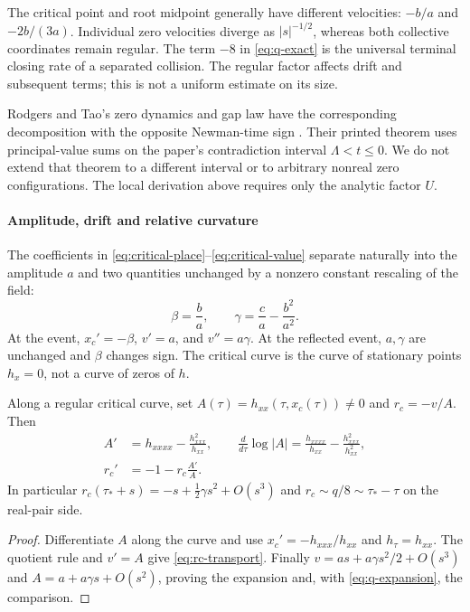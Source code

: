 The critical point and root midpoint generally have different velocities:
\(-b/a\) and \(-2b/(3a)\). Individual zero velocities diverge as
\(|s|^{-1/2}\), whereas both collective coordinates remain regular.
The term \(-8\) in \eqref{eq:q-exact} is the universal terminal closing
rate of a separated collision. The regular factor affects drift
and subsequent terms; this is not a uniform estimate on its size.

Rodgers and Tao's zero dynamics and gap law have the corresponding
decomposition with the opposite Newman-time sign
\cite[Section~4, Theorem~4.16 and Lemma~4.18(i)]{RodgersTao2020}.
Their printed theorem uses principal-value sums on the paper's
contradiction interval \(\Lambda<t\leq0\). We do not extend that theorem
to a different interval or to arbitrary nonreal zero configurations.
The local derivation above requires only the analytic factor \(U\).


\paragraph{Amplitude, drift and relative curvature}
The coefficients in \eqref{eq:critical-place}--\eqref{eq:critical-value}
separate naturally into the amplitude \(a\) and two quantities unchanged
by a nonzero constant rescaling of the field:
\begin{equation}\label{eq:beta-gamma}
 \beta=\frac ba,\qquad \gamma=\frac ca-\frac{b^2}{a^2}.
\end{equation}
At the event, \(x_c'=-\beta\), \(v'=a\), and \(v''=a\gamma\).
At the reflected event, \(a,\gamma\) are unchanged and \(\beta\)
changes sign. The critical curve is the curve of stationary points
\(h_x=0\), not a curve of zeros of \(h\).

\begin{proposition}
\label{prop:curvature-transport}
Along a regular critical curve, set
\(A(\tau)=h_{xx}(\tau,x_c(\tau))\ne0\) and \(r_c=-v/A\).
Then
\begin{align}
 A'&=h_{xxxx}-\frac{h_{xxx}^2}{h_{xx}},\qquad
 \frac{d}{d\tau}\log|A|
 =\frac{h_{xxxx}}{h_{xx}}-\frac{h_{xxx}^2}{h_{xx}^2},
 \label{eq:A-transport}\\
 r_c'&=-1-r_c\frac{A'}{A}.\label{eq:rc-transport}
\end{align}
In particular \(r_c(\tau_*+s)=-s+\tfrac12\gamma s^2+O(s^3)\)
and \(r_c\sim q/8\sim\tau_*-\tau\) on the real-pair side.
\end{proposition}
\begin{proof}
Differentiate \(A\) along the curve and use
\(x_c'=-h_{xxx}/h_{xx}\) and \(h_\tau=h_{xx}\).
The quotient rule and \(v'=A\) give \eqref{eq:rc-transport}.
Finally \(v=as+a\gamma s^2/2+O(s^3)\) and
\(A=a+a\gamma s+O(s^2)\), proving the expansion and, with
\eqref{eq:q-expansion}, the comparison.
\end{proof}

